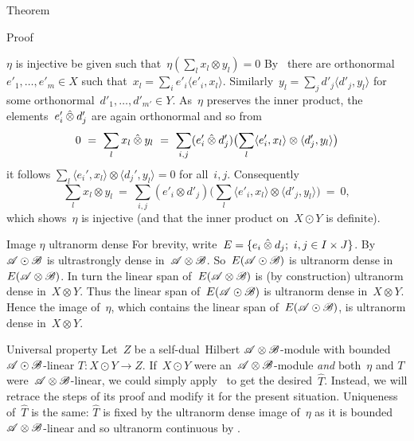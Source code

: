 \documentclass[b]{subfiles}
\begin{document}
\begin{parsec}
\begin{point}{Theorem}
\begin{point}{Proof}
\begin{point}{$\eta$ is injective}
    be given such that~$\eta(\sum_l x_l \otimes y_l) = 0$
By~
    there are orthonormal~$e'_1,\ldots, e'_m \in X$
    such that~$x_l = \sum_i e'_i \langle e'_i, x_l\rangle$.
Similarly~$y_l = \sum_j d'_j \langle d'_j, y_l\rangle$
for some orthonormal~$d'_1, \ldots, d'_{m'} \in Y$.
As~$\eta$ preserves the inner product,
    the elements~$e_i'\mathbin{\hat{\otimes}} d_j'$ are again orthonormal
    and so from
\begin{equation*}
    0 \ =\  \sum_l x_l \mathbin{\hat{\otimes}} y_l
    \ =\  \sum_{i,j} (e'_i \mathbin{\hat{\otimes}} d'_j) \bigl(\sum_l
         \langle e'_i, x_l\rangle \otimes \langle d'_j, y_l\rangle\bigr)
\end{equation*}
         it follows
         $\sum_l \langle e_i',x_l\rangle \otimes \langle d_j',y_l\rangle = 0$
         for all~$i,j$.
Consequently
\begin{equation*}
    \sum_l x_l \otimes y_l
        \ =\  \sum_{i,j} (e'_i \otimes d'_j) \bigl(\sum_l
        \langle e'_i, x_l \rangle \otimes \langle d'_j, y_l \rangle 
        \bigr) \ = \ 0,
\end{equation*}
which shows~$\eta$ is injective
    (and that the inner product on~$X \odot Y$ is definite).
\end{point}
\begin{point}{Image $\eta$ ultranorm dense}%
For brevity, write~$E = \{ e_i \mathbin{\hat{\otimes}} d_j; \ i,j \in I\times J\}$.
By~\TODO{} $\mathscr{A} \odot \mathscr{B}$ is ultrastrongly dense in~$\mathscr{A} \otimes \mathscr{B}$.
So~$E (\mathscr{A} \odot \mathscr{B})$
    is ultranorm dense in~$E (\mathscr{A} \otimes \mathscr{B})$.
In turn the linear span of~$E (\mathscr{A} \otimes \mathscr{B})$
    is (by construction) ultranorm dense in~$X \otimes Y$.
Thus the linear span of~$E (\mathscr{A} \odot \mathscr{B})$
    is ultranorm dense in~$X \otimes Y$.
Hence the image of~$\eta$,
    which contains the linear span of~$E (\mathscr{A} \odot \mathscr{B})$,
    is ultranorm dense in~$X \otimes Y$.
\end{point}
\begin{point}{Universal property}%
Let~$Z$ be a self-dual~Hilbert $\mathscr{A} \otimes \mathscr{B}$-module
 with bounded~$\mathscr{A} \odot \mathscr{B}$-linear $T\colon X \odot Y \to Z$.
If~$X \odot Y$ were an~$\mathscr{A} \otimes \mathscr{B}$-module
    \emph{and} both~$\eta$ and $T$ were~$\mathscr{A} \otimes \mathscr{B}$-linear,
    we could simply apply~
    to get the desired~$\hat{T}$.
Instead, we will retrace the steps of its proof
    and modify it for the present situation.
Uniqueness of~$\hat{T}$ is the same:
    $\hat{T}$ is fixed by the ultranorm dense image of~$\eta$
    as it is bounded~$\mathscr{A}\otimes\mathscr{B}$-linear
    and so ultranorm continuous by .


\end{point}
\end{point}
\end{point}
\end{parsec}
\end{document}
